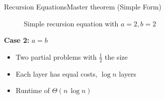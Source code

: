 
\begin{frame}{Recursion Equations}{Master theorem (Simple Form)}
  \begin{figure}[!h]
    \begin{adjustbox}{width=\linewidth}
      \def\AlgoREDivide{2}%
      \def\AlgoRESize{0.5}%
      \def\AlgoREScale{15}%
      
    \end{adjustbox}
    \caption{Simple recursion equation with {\color{Mittel-Blau}$a = 2, b = 2$}}
    \label{fig:recursion_equations:master_theorem_tree_2_2}
  \end{figure}
  \textbf{Case 2:} {\color{Mittel-Blau}$a = b$}
  \begin{itemize}
    \item<3->
      Two partial problems with $\frac{1}{2}$ the size
    \item<4->
      Each layer has equal costs, $\log n$ layers
    \item<5->
      Runtime of {\color{Mittel-Blau}$\Theta(n \, \log n)$}
  \end{itemize}
\end{frame}


%      

